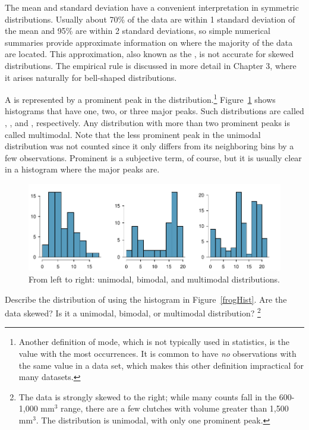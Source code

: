 The mean and standard deviation have a convenient interpretation in symmetric distributions.  Usually about 70\% of the data are within 1 standard deviation of the mean and 95\% are within 2 standard deviations, so simple numerical summaries provide approximate information on where the majority of the data are located.  This approximation, also known as the , is not accurate for skewed distributions.  The empirical rule is discussed in more detail in Chapter 3, where it arises naturally for bell-shaped distributions.

A  is represented by a prominent peak in the distribution.\footnote{Another definition of mode, which is not typically used in statistics, is the value with the most occurrences. It is common to have \emph{no} observations with the same value in a data set, which makes this other definition impractical for many datasets.} Figure~\ref{singleBiMultiModalPlots} shows histograms that have one, two, or three major peaks. Such distributions are called , , and , respectively. Any distribution with more than two prominent peaks is called multimodal. Note that the less prominent peak in the unimodal distribution was not counted since it only differs from its neighboring bins by a few observations. Prominent is a subjective term, of course, but it is usually clear in a histogram where the major peaks are.  


\begin{figure}[h]
	\centering
	\includegraphics[width=\textwidth]{ch_intro_to_data_oi_biostat/figures/singleBiMultiModalPlots/singleBiMultiModalPlots}
	\caption{From left to right: unimodal, bimodal, and multimodal distributions.}
	\label{singleBiMultiModalPlots}
\end{figure}

\begin{exercise}
	Describe the distribution of  using the histogram in Figure~\ref{frogHist}. Are the data skewed? Is it a unimodal, bimodal, or multimodal distribution? \footnote{The data is strongly skewed to the right; while many counts fall in the 600-1,000 $\textrm {mm}^{3}$ range, there are a few clutches with volume greater than 1,500 $\textrm {mm}^{3}$. The distribution is unimodal, with only one prominent peak.}
\end{exercise}


